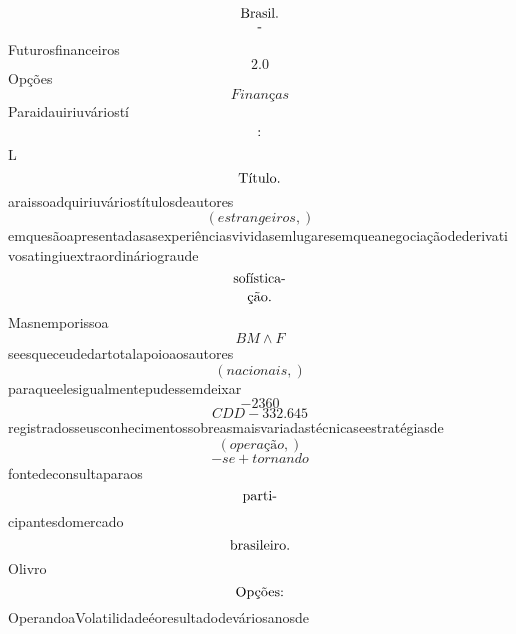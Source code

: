 \documentclass{article}
\begin{document}
\begin{equation}
$Brasil.$
\end{equation}\begin{equation}
$-$
\end{equation}Futurosfinanceiros\begin{equation}
2.0
\end{equation}Opções\begin{equation}
Finanças
\end{equation}Paraidauiriuváriostí\begin{equation}
$:$
\end{equation}L\begin{equation}
$Título.$
\end{equation}araissoadquiriuváriostítulosdeautores\begin{equation}
\left( estrangeiros,\right)
\end{equation}emquesãoapresentadasasexperiênciasvividasemlugaresemqueanegociaçãodederivativosatingiuextraordináriograude\begin{equation}
$sofística-$
\end{equation}\begin{equation}
$ção.$
\end{equation}Masnemporissoa\begin{equation}
BM \wedge F
\end{equation}seesqueceudedartotalapoioaosautores\begin{equation}
\left( nacionais,\right)
\end{equation}paraqueelesigualmentepudessemdeixar\begin{equation}
-2360
\end{equation}\begin{equation}
CDD - 332.645
\end{equation}registradosseusconhecimentossobreasmaisvariadastécnicaseestratégiasde\begin{equation}
\left( operação,\right)
\end{equation}\begin{equation}
- se + tornando
\end{equation}fontedeconsultaparaos\begin{equation}
$parti-$
\end{equation}cipantesdomercado\begin{equation}
$brasileiro.$
\end{equation}Olivro\begin{equation}
$Opções:$
\end{equation}OperandoaVolatilidadeéoresultadodeváriosanosde\begin{equation}

\end{equation}
\end{document}
